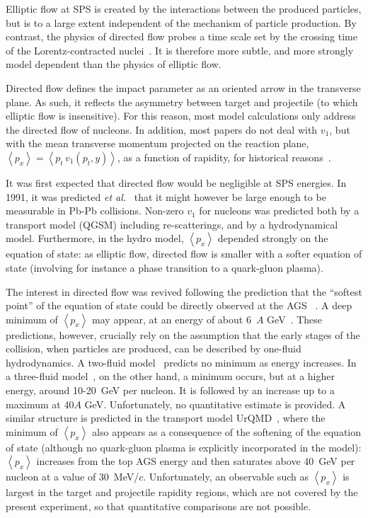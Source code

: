\documentclass[aps,prc,superscriptaddress,showpacs,floatfix,nofootinbib]{revtex4}
\newcommand{\mean}[1]{\left\langle #1 \right\rangle}
\begin{document}
Elliptic flow at SPS is created by the interactions between the
produced particles, but is to a large extent independent of the
mechanism of particle production. By contrast, the physics of directed
flow probes a time scale set by the crossing time of the
Lorentz-contracted nuclei~\cite{Bleicher:2002xx}.  It is therefore
more subtle, and more strongly model dependent than the physics of
elliptic flow.

Directed flow defines the impact parameter as an oriented arrow in the
transverse plane. As such, it reflects the asymmetry between target
and projectile (to which elliptic flow is insensitive).  For this
reason, most model calculations only address the directed flow of
nucleons.  In addition, most papers do not deal with $v_1$, but with
the mean transverse momentum projected on the reaction plane,
$\mean{p_x}=\mean{p_t\, v_1(p_t,y)}$, as a function of rapidity, for
historical reasons~\cite{Danielewicz:hn}.

It was first expected that directed flow would be negligible at SPS
energies.  In 1991, it was predicted {\em et al.}~\cite{Amelin:cs}
that it might however be large enough to be measurable in Pb-Pb
collisions. Non-zero $v_1$ for nucleons was predicted both by a
transport model (QGSM) including re-scatterings, and by a
hydrodynamical model. Furthermore, in the hydro model, $\mean{p_x}$
depended strongly on the equation of state: as elliptic flow, directed
flow is smaller with a softer equation of state (involving for
instance a phase transition to a quark-gluon plasma).

The interest in directed flow was revived following the prediction
that the ``softest point'' of the equation of state could be directly
observed at the AGS ~\cite{Hung:1994eq}.  A deep minimum of
$\mean{p_x}$ may appear, at an energy of about
6~$A$ GeV~\cite{Rischke:1995pe}.  These predictions, however,
crucially rely on the assumption that the early stages of the
collision, when particles are produced, can be described by one-fluid
hydrodynamics.  A two-fluid model~\cite{Ivanov:2000dr} predicts no
minimum as energy increases.  In a three-fluid
model~\cite{Brachmann:1999xt}, on the other hand, a minimum occurs,
but at a higher energy, around 10-20~GeV per nucleon. It is followed
by an increase up to a maximum at 40$A$ GeV.  Unfortunately, no
quantitative estimate is provided.  A similar structure is predicted
in the transport model UrQMD~\cite{Bleicher:2002xx}, where the minimum
of $\mean{p_x}$ also appears as a consequence of the softening of the
equation of state (although no quark-gluon plasma is explicitly
incorporated in the model): $\mean{p_x}$ increases from the top AGS
energy and then saturates above 40~GeV per nucleon at a value of
$30$~MeV/$c$.  Unfortunately, an observable such as $\mean{p_x}$ is
largest in the target and projectile rapidity regions, which are not
covered by the present experiment, so that quantitative comparisons
are not possible.
\end{document}
